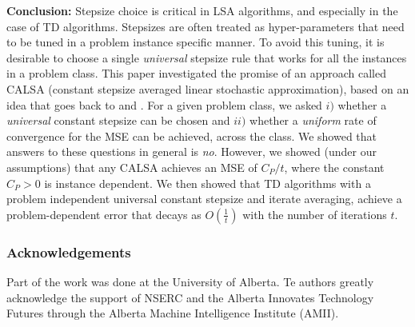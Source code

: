\textbf{Conclusion:} 
Stepsize choice is critical in LSA algorithms, and especially in the case of TD algorithms.
Stepsizes are often treated as hyper-parameters that need to be tuned in a problem instance specific manner. To avoid this tuning, it is desirable to choose a single \emph{universal} stepsize rule that works for all the instances in a problem class. This paper investigated the promise of an approach called CALSA (constant stepsize averaged linear stochastic approximation), based on an idea that goes back to \citet{ruppert} and \citet{polyak-judisky}. For a given problem class, we asked $i)$ whether a \emph{universal} constant stepsize can be chosen and $ii)$ whether a \emph{uniform} rate of convergence for the MSE can be achieved, across the class. We showed that answers to these questions in general is \emph{no}. However, we showed (under our assumptions) that any CALSA achieves an MSE of $C_P/t$, where the constant $C_P>0$ is instance dependent. We then showed that TD algorithms with a problem independent universal constant stepsize and iterate averaging, achieve a problem-dependent error 
that decays as $O(\frac{1}{t})$ with the number of iterations $t$.
\subsubsection*{Acknowledgements}
Part of the work was done at the University of Alberta.
Te authors greatly acknowledge the
support of NSERC and the Alberta Innovates Technology
Futures through the Alberta Machine Intelligence
Institute (AMII).